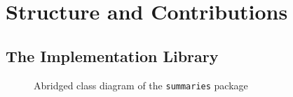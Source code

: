 \section{Structure and Contributions}
\label{sec:introduction-structure}

\subsection{The Implementation Library}
\label{subsec:introduction-structure-library}

\begin{figure}
  \centering
  \caption{Abridged class diagram of the \lstinline{summaries} package}
  \label{fig:introduction-structure-library-summaries}
\end{figure}

